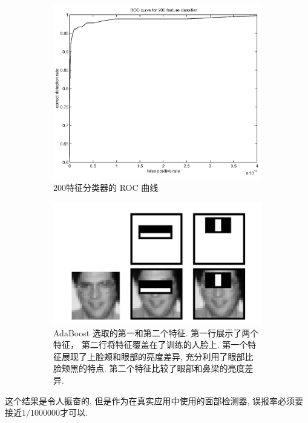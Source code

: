 \documentclass[a4paper,utf8,11pt, onecolumn]{ctexart}
\renewcommand{\captionlabelfont}{\kaishu\zihao{5}}
\begin{document}
\begin{figure}
\center
\begin{subfigure}{0.3\textwidth}
\includegraphics[width=\textwidth]{200.png}
\renewcommand{\captionlabelfont}{\kaishu\zihao{6}}
\caption{$200$特征分类器的 ROC 曲线}
\label{fig:f2}
\end{subfigure}
\quad\quad\quad\quad
\begin{subfigure}{0.3\textwidth}
\includegraphics[width=\textwidth]{eye.png}
\renewcommand{\captionlabelfont}{\kaishu\zihao{6}}
\caption{AdaBoost 选取的第一和第二个特征. 第一行展示了两个特征， 第二行将特征覆盖在了训练的人脸上. 第一个特征展现了上脸颊和眼部的亮度差异, 充分利用了眼部比脸颊黑的特点. 第二个特征比较了眼部和鼻梁的亮度差异.}
\label{fig:eye}
\end{subfigure}
\caption{}
\end{figure}
这个结果是令人振奋的, 但是作为在真实应用中使用的面部检测器, 误报率必须要接近$1/1000000$才可以.
\end{document}
